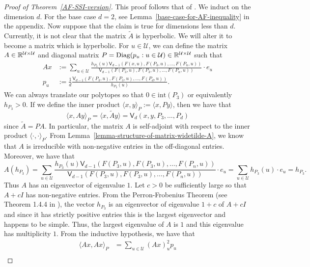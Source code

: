 \documentclass{puthesis-UG}
\begin{document}
\begin{proof}[Proof of Theorem~\ref{AF-SSI-version}]
	This proof follows that of \cite{bochner}. We induct on the dimension $d$. For the base case $d = 2$, see Lemma~\ref{base-case-for-AF-inequality} in the appendix. Now suppose that the claim is true for dimensions less than $d$. Currently, it is not clear that the matrix $\widetilde{A}$ is hyperbolic. We will alter it to become a matrix which is hyperbolic. For $u \in \mathcal{U}$, we can define the matrix $A \in \mathbb{R}^{\mathcal{U} \times \mathcal{U}}$ and diagonal matrix $P = \text{Diag}(p_u : u \in \mathcal{U}) \in \mathbb{R}^{\mathcal{U} \times \mathcal{U}}$ such that 
	\begin{align*}
		Ax & := \sum_{u \in \mathcal{U}} \frac{h_{P_3}(u) \mathsf{V}_{d-1} (F(x, u), F(P_3, u), \ldots, F(P_n, u))}{\mathsf{V}_{d-1}(F(P_3, u), F(P_3, u), \ldots, F(P_n, u))} \cdot e_u\\
		p_u & := \frac{1}{d} \frac{\mathsf{V}_{d-1} (F(P_3, u), F(P_3, u), \ldots, F(P_d, u))}{h_{P_3}(u)}.
	\end{align*}
	We can always translate our polytopes so that $0 \in \text{int}(P_3)$ or equivalently $h_{P_3} > 0$. If we define the inner product $\langle x, y \rangle_{P} := \langle x, P y \rangle$, then we have that 
	\[
		\langle x, Ay \rangle_P = \langle x, \widetilde{A} y \rangle = \mathsf{V}_d (x, y, P_3, \ldots, P_d)
	\]
	since $\widetilde{A} = PA$. In particular, the matrix $A$ is self-adjoint with respect to the inner product $\langle \cdot, \cdot \rangle_P$. From Lemma~\ref{lemma-structure-of-matrix-widetilde-A}, we know that $A$ is irreducible with non-negative entries in the off-diagonal entries. Moreover, we have that 
	\[
		A(h_{P_3}) = \sum_{u \in \mathcal{U}}\frac{h_{P_3}(u) \mathsf{V}_{d-1} (F(P_3, u), F(P_3, u), \ldots, F(P_n, u))}{\mathsf{V}_{d-1}(F(P_3, u), F(P_3, u), \ldots, F(P_n, u))} \cdot e_u = \sum_{u \in \mathcal{U}} h_{P_3}(u) \cdot e_u = h_{P_3}.
	\]
	Thus $A$ has an eigenvector of eigenvalue $1$. Let $c > 0$ be sufficiently large so that $A + c I$ has non-negative entries. From the Perron-Frobenius Theorem (see Theorem 1.4.4 in \cite{bapat_raghavan_1997}), the vector $h_{P_3}$ is an eigenvector of eigenvalue $1 + c$ of $A + cI$ and since it has strictly positive entries this is the largest eigenvector and happens to be simple. Thus, the largest eigenvalue of $A$ is $1$ and this eigenvalue has multiplicity $1$. From the inductive hypothesis, we have that
	\begin{align*}
		\langle Ax, Ax \rangle_P & = \sum_{u \in \mathcal{U}} (Ax)_u^2 p_u \\

\end{align*}
\end{proof}
\end{document}

